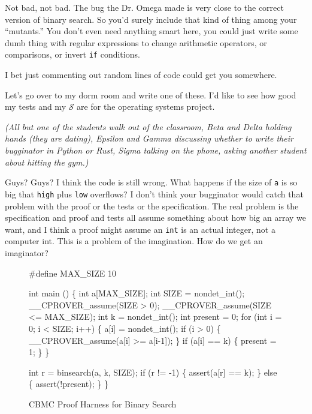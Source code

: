 \documentclass[sigplan]{acmart}
\begin{document}
   Not bad, not bad.  The bug the Dr. Omega
made is very close to the correct version of binary search.  So you'd
surely include that kind of thing among your ``mutants.''   You don't
even need anything smart here, you could just write some dumb thing
with regular expressions to change arithmetic operators, or
comparisons, or invert {\tt if} conditions.

  I bet just commenting out random lines
of code could get you somewhere.

 Let's go over to my dorm room and write
one of these.  I'd like to see how good my tests and my $\mathcal{S}$
are for the operating systems project.

\vspace{0.1in}

\emph{(All but one of the students walk out of the classroom, Beta and Delta holding
  hands (they are dating), Epsilon and Gamma discussing whether to
  write their bugginator in Python or Rust, Sigma talking on the
  phone, asking another student about hitting the gym.)}

\vspace{0.1in}

  Guys?  Guys?  I think the code is still
wrong.  What happens if the size of {\tt a} is so big that {\tt high}
plus {\tt low} overflows?  I don't think your bugginator would catch
that problem with the proof or the tests or the specification.  The
real problem is the specification and proof and tests all assume
something about how big an array we want, and I think a proof might
assume an {\tt int} is an actual integer, not a computer int.  This is a problem
of the imagination.  How do we get an imaginator?


\begin{figure*}
  {\scriptsize
  \begin{code}
\#define MAX\_SIZE 10

int main () \{
  int a[MAX\_SIZE];
  int SIZE = nondet\_int();
  \_\_CPROVER\_assume(SIZE > 0);
  \_\_CPROVER\_assume(SIZE <= MAX\_SIZE);
  int k = nondet\_int();
  int present = 0;
  for (int i = 0; i < SIZE; i++) \{
    a[i] = nondet\_int();
    if (i > 0) \{
      \_\_CPROVER\_assume(a[i] >= a[i-1]);
    \}
    if (a[i] == k) \{
      present = 1;
    \}
  \}

  int r = binsearch(a, k, SIZE);
  if (r != -1) \{
    assert(a[r] == k);
  \} else \{
    assert(!present);
  \}
  \}
\end{code}
}
\caption{CBMC Proof Harness for Binary Search}
\label{fig:cbmc}
\end{figure*}
\end{document}
